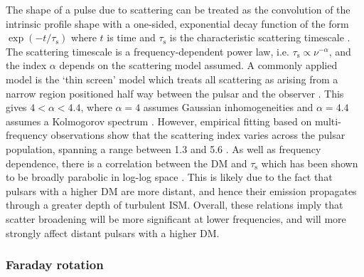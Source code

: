 The shape of a pulse due to scattering can be treated as the convolution of the intrinsic profile shape with a one-sided, exponential decay function of the form $\exp{(-t/\tau_\mathrm{s})}$ where $t$ is time and $\tau_\mathrm{s}$ is the characteristic scattering timescale \citep{Sxxx1968}. The scattering timescale is a frequency-dependent power law, i.e. $\tau_\mathrm{s} \propto \nu^{-\alpha}$, and the index $\alpha$ depends on the scattering model assumed. A commonly applied model is the `thin screen' model which treats all scattering as arising from a narrow region positioned half way between the pulsar and the observer \citep[e.g.][]{Sxxx1968, Wxxx1972}. This gives $4 < \alpha < 4.4$, where $\alpha = 4$ assumes Gaussian inhomogeneities \citep{Lxxx1971,LLxx1976} and $\alpha = 4.4$ assumes a Kolmogorov spectrum \citep{Rxxx1977,LRK+2015}. However, empirical fitting based on multi-frequency observations show that the scattering index varies across the pulsar population, spanning a range between 1.3 and 5.6 \citep{SDOx1980,LMG+2004, LDKK2013, LKKx2015, GKK+2017}. As well as frequency dependence, there is a correlation between the DM and $\tau_\mathrm{s}$ which has been shown to be broadly parabolic in log-log space \citep[e.g.][]{BCC+2004,GKK+2017,IJWx2019}. This is likely due to the fact that pulsars with a higher DM are more distant, and hence their emission propagates through a greater depth of turbulent ISM. Overall, these relations imply that scatter broadening will be more significant at lower frequencies, and will more strongly affect distant pulsars with a higher DM.


\subsubsection{Faraday rotation}
\label{sec: intro - observation processing - ISM effects - faraday rotation}

